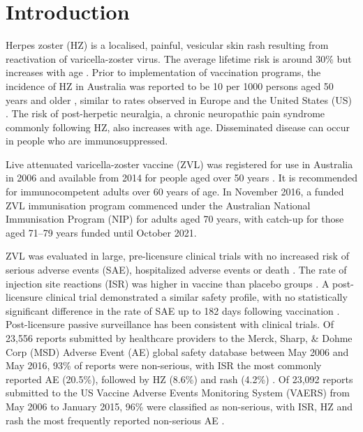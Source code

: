 \documentclass[review, endfloat]{elsarticle}
\begin{document}
\section{Introduction}

Herpes zoster (HZ) is a localised, painful, vesicular skin rash resulting from reactivation of varicella-zoster virus. The average lifetime risk is around 30\% but increases with age \citep{brisson2001epidemiology}. Prior to implementation of vaccination programs, the incidence of HZ in Australia was reported to be 10 per 1000 persons aged 50 years and older \citep{stein2009herpes}, similar to rates observed in Europe \citep{pinchinat2013similar} and the United States (US) \citep{insinga2005incidence}. The risk of post-herpetic neuralgia, a chronic neuropathic pain syndrome commonly following HZ, also increases with age. Disseminated disease can occur in people who are immunosuppressed. 

Live attenuated varicella-zoster vaccine (ZVL) was registered for use in Australia in 2006 and available from 2014 for people aged over 50 years \citep{yawn2007population}. It is recommended for immunocompetent adults over 60 years of age. In November 2016, a funded ZVL immunisation program commenced under the Australian National Immunisation Program (NIP) for adults aged 70 years, with catch-up for those aged 71–79 years funded until October 2021. 

ZVL was evaluated in large, pre-licensure clinical trials with no increased risk of serious adverse events (SAE), hospitalized adverse events or death \cite{oxman2005, gagliardi2016vaccines, schmader2012}. The rate of injection site reactions (ISR) was higher in vaccine than placebo groups \cite{oxman2005, schmader2012}. A post-licensure clinical trial demonstrated a similar safety profile, with no statistically significant difference in the rate of SAE up to 182 days following vaccination \citep{murray2011}. Post-licensure passive surveillance has been consistent with clinical trials. Of 23,556 reports submitted by healthcare providers to the Merck, Sharp, \& Dohme Corp (MSD) Adverse Event (AE) global safety database between May 2006 and May 2016, 93\% of reports were non-serious, with ISR the most commonly reported AE (20.5\%), followed by HZ (8.6\%) and rash (4.2\%) \citep{willis2017herpes}. Of 23,092 reports submitted to the US Vaccine Adverse Events Monitoring System (VAERS) from May 2006 to January 2015, 96\% were classified as non-serious, with ISR, HZ and rash the most frequently reported non-serious AE \citep{miller2018post}.
\end{document}
